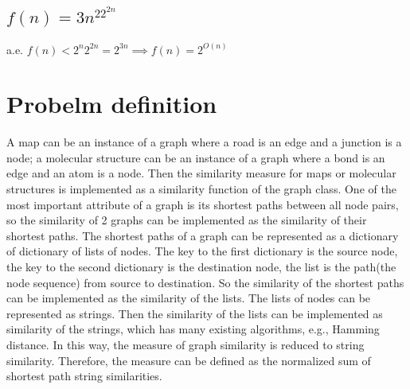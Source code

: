 \documentclass{article}
\begin{document}
\subsection{$f(n) = 3n^22^{2n}$}
a.e. $f(n) < 2^n 2^{2n} = 2^{3n}
\implies f(n) = 2^{O(n)}$

\section{Probelm definition}
A map can be an instance of a graph where a road is an edge and a junction is
a node; a molecular structure can be an instance of a graph where a bond is
an edge and an atom is a node. Then the similarity measure for maps or molecular
structures is implemented as a similarity function of the graph class. One of
the most important attribute of a graph is its shortest paths between all node
pairs, so the similarity of 2 graphs can be implemented as the similarity of
their shortest paths. The shortest paths of a graph can be represented as a
dictionary of dictionary of lists of nodes. The key to the first dictionary is
the source node, the key to the second dictionary is the destination node, the
list is the path(the node sequence) from source to destination. So the
similarity of the shortest paths can be implemented as the similarity of the
lists. The lists of nodes can be represented as strings. Then the similarity of
the lists can be implemented as similarity of the strings, which has many
existing algorithms, e.g., Hamming distance. In this way, the measure of graph
similarity is reduced to string similarity. Therefore, the measure can be
defined as the normalized sum of shortest path string similarities.
\end{document}
